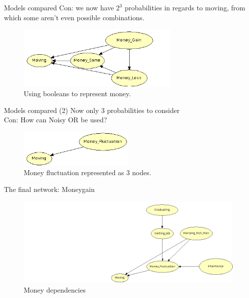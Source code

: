 \documentclass{beamer}
\begin{document}
\begin{frame}{Models compared}
    Con: we now have $2^3$ probabilities in regards to moving, from which some aren't even
    possible combinations.
    \begin{figure}[h!]
  \centering
    \includegraphics[width=0.7\textwidth]{booleanMoney.png}
  \caption{Using booleans to represent money.}
\end{figure}
\end{frame}


\begin{frame}{Models compared (2)}
    Now only 3 probabilities to consider\\
    Con: How can Noisy OR be used?
\begin{figure}[h!]
  \centering
    \includegraphics[width=0.5\textwidth]{3ValueMoney.png}
  \caption{Money fluctuation represented as 3 nodes.}
\end{figure}
\end{frame}


\begin{frame}{The final network: Moneygain}
\begin{figure}[h!]
  \centering
    \includegraphics[width=1.1\textwidth]{network1.png}
  \caption{Money dependencies}
\end{figure}
\end{frame}
\end{document}
